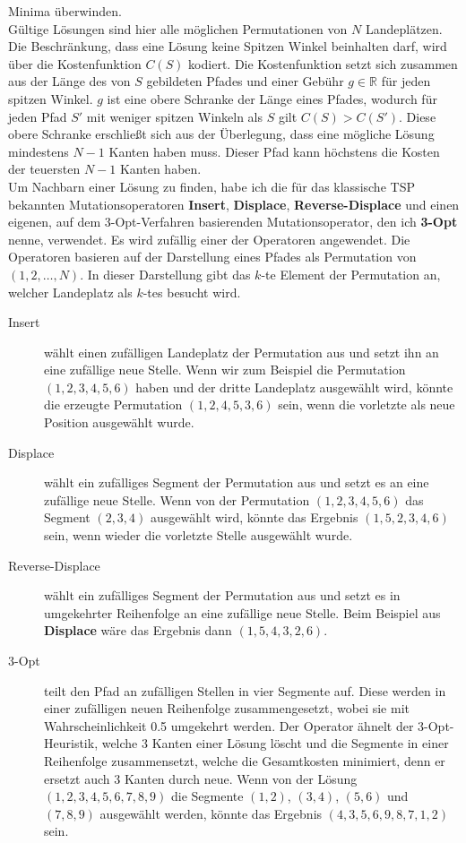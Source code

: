 \documentclass[a4paper,10pt,ngerman]{scrartcl}
\begin{document}
Minima überwinden.\\
Gültige Lösungen sind hier alle möglichen Permutationen von $N$ Landeplätzen. Die Beschränkung, dass eine
Lösung keine Spitzen Winkel beinhalten darf, wird über die Kostenfunktion $C(S)$ kodiert. Die Kostenfunktion
setzt sich zusammen aus der Länge des von $S$ gebildeten Pfades und einer Gebühr $g \in \mathbb{R}$ für jeden spitzen Winkel. $g$
ist eine obere Schranke der Länge eines Pfades, wodurch für jeden Pfad $S'$ mit weniger spitzen Winkeln als $S$
gilt $C(S) > C(S')$. Diese obere Schranke erschließt sich aus der Überlegung, dass eine mögliche Lösung mindestens $N-1$ Kanten haben muss.
Dieser Pfad kann höchstens die Kosten der teuersten $N-1$ Kanten haben. \\
Um Nachbarn einer Lösung zu finden, habe ich die für das klassische TSP bekannten Mutationsoperatoren \textbf{Insert}, \textbf{Displace}, \textbf{Reverse-Displace}
\cite{larranaga_1999}
und einen eigenen, auf dem 3-Opt-Verfahren basierenden Mutationsoperator, den ich \textbf{3-Opt} nenne, verwendet. Es wird zufällig einer der Operatoren angewendet.
Die Operatoren basieren auf der
Darstellung eines Pfades als Permutation von $(1, 2, \ldots, N)$. In dieser Darstellung gibt das $k$-te Element der Permutation
an, welcher Landeplatz als $k$-tes besucht wird.
\begin{description}
  \item[Insert] wählt einen zufälligen Landeplatz der Permutation aus und setzt ihn an
    eine zufällige neue Stelle. Wenn wir zum Beispiel die Permutation
    $(1,2,3,4,5,6)$ haben und der dritte Landeplatz ausgewählt wird, könnte die
    erzeugte Permutation $(1,2,4,5,3,6)$ sein, wenn die vorletzte als neue Position
    ausgewählt wurde.
  \item[Displace] wählt ein zufälliges Segment der Permutation aus und setzt es an eine
    zufällige neue Stelle. Wenn von der Permutation $(1,2,3,4,5,6)$ das Segment
    $(2,3,4)$ ausgewählt wird, könnte das Ergebnis $(1,5,2,3,4,6)$ sein, wenn
    wieder die vorletzte Stelle ausgewählt wurde.
  \item[Reverse-Displace] wählt ein zufälliges Segment der Permutation aus und setzt es
    in umgekehrter Reihenfolge an eine zufällige neue Stelle. Beim Beispiel aus
    \textbf{Displace} wäre das Ergebnis dann $(1,5,4,3,2,6)$.
  \item[3-Opt] teilt den Pfad an zufälligen Stellen in vier Segmente auf. Diese werden
    in einer zufälligen neuen Reihenfolge zusammengesetzt, wobei sie mit Wahrscheinlichkeit
    0.5 umgekehrt werden. Der Operator ähnelt der 3-Opt-Heuristik, welche 3 Kanten einer
    Lösung löscht und die Segmente in einer Reihenfolge zusammensetzt, welche die Gesamtkosten
    minimiert, denn er ersetzt auch 3 Kanten durch neue. Wenn von der Lösung $(1,2,3,4,5,6,7,8,9)$ die Segmente
    $(1,2)$, $(3,4)$, $(5,6)$ und $(7,8,9)$ ausgewählt werden, könnte das Ergebnis $(4,3,5,6,9,8,7,1,2)$ sein.
\end{description}
\end{document}
